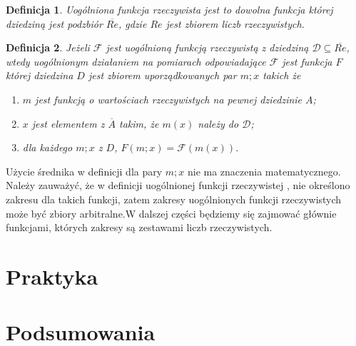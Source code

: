 \documentclass[12pt,a4paper]{report}
\newtheorem{definition}{Definicja}[chapter]
\begin{document}
\begin{definition}
Uogólniona funkcja rzeczywista jest to dowolna funkcja której dziedziną jest podzbiór $\overline{Re}$, gdzie $Re$ jest zbiorem liczb rzeczywistych.
\end{definition}
\begin{definition}
Jeżeli $\mathcal{F}$ jest uogólnioną funkcją rzeczywistą z dziedziną $\mathcal{D}\subseteq\overline{Re}$, wtedy uogólnionym działaniem na pomiarach odpowiadające $\mathcal{F}$ jest funkcja $F$ której dziedzina $D$ jest zbiorem uporządkowanych par $m;x$ takich że
\begin{enumerate}
\item
$m$ jest funkcją o wartościach rzeczywistych na pewnej dziedzinie $A$;
\item
$x$ jest elementem z $\overline{A}$ takim, że $m(x)$ należy do $\mathcal{D}$;
\item
dla każdego $m;x$ z $D$, $F(m;x)=\mathcal{F}(m(x))$.
\end{enumerate}

\end{definition}
Użycie średnika w definicji dla pary $m;x$ nie ma znaczenia matematycznego. Należy zauważyć, że w definicji uogólnionej funkcji rzeczywistej , nie określono zakresu dla takich funkcji, zatem zakresy uogólnionych funkcji rzeczywistych może być zbiory arbitralne.W dalszej części będziemy się zajmować głównie funkcjami, których zakresy są zestawami liczb rzeczywistych. 
\chapter{Praktyka}

\chapter{Podsumowania}



\end{document}
